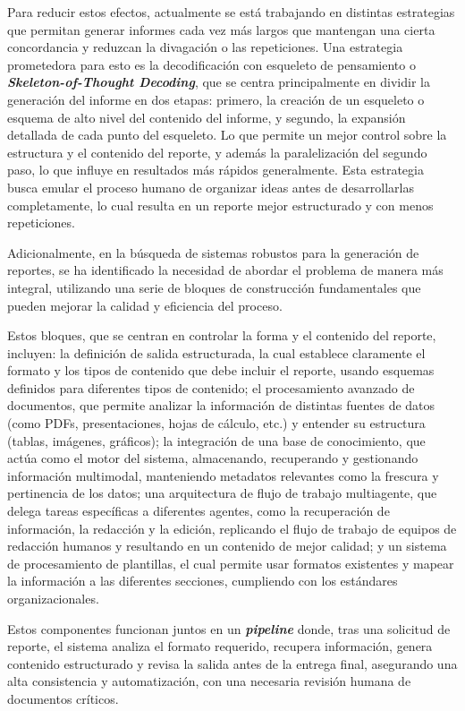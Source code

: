 Para reducir estos efectos, actualmente se está trabajando en distintas estrategias que permitan generar informes cada vez más largos que mantengan una cierta concordancia y reduzcan la divagación o las repeticiones. Una estrategia prometedora para esto es la decodificación con esqueleto de pensamiento o \textit{\textbf{Skeleton-of-Thought Decoding}}, que se centra principalmente en dividir la generación del informe en dos etapas: primero, la creación de un esqueleto o esquema de alto nivel del contenido del informe, y segundo, la expansión detallada de cada punto del esqueleto. Lo que permite un mejor control sobre la estructura y el contenido del reporte, y además la paralelización del segundo paso, lo que influye en resultados más rápidos generalmente. Esta estrategia busca emular el proceso humano de organizar ideas antes de desarrollarlas completamente, lo cual resulta en un reporte mejor estructurado y con menos repeticiones.

Adicionalmente, en la búsqueda de sistemas robustos para la generación de reportes, se ha identificado la necesidad de abordar el problema de manera más integral, utilizando una serie de bloques de construcción fundamentales que pueden mejorar la calidad y eficiencia del proceso. 

Estos bloques, que se centran en controlar la forma y el contenido del reporte, incluyen: la definición de salida estructurada, la cual establece claramente el formato y los tipos de contenido que debe incluir el reporte, usando esquemas definidos para diferentes tipos de contenido; el procesamiento avanzado de documentos, que permite analizar la información de distintas fuentes de datos (como PDFs, presentaciones, hojas de cálculo, etc.) y entender su estructura (tablas, imágenes, gráficos); la integración de una base de conocimiento, que actúa como el motor del sistema, almacenando, recuperando y gestionando información multimodal, manteniendo metadatos relevantes como la frescura y pertinencia de los datos; una arquitectura de flujo de trabajo multiagente, que delega tareas específicas a diferentes agentes, como la recuperación de información, la redacción y la edición, replicando el flujo de trabajo de equipos de redacción humanos y resultando en un contenido de mejor calidad; y un sistema de procesamiento de plantillas, el cual permite usar formatos existentes y mapear la información a las diferentes secciones, cumpliendo con los estándares organizacionales.

 Estos componentes funcionan juntos en un \textit{\textbf{pipeline}} donde, tras una solicitud de reporte, el sistema analiza el formato requerido, recupera información, genera contenido estructurado y revisa la salida antes de la entrega final, asegurando una alta consistencia y automatización, con una necesaria revisión humana de documentos críticos.

